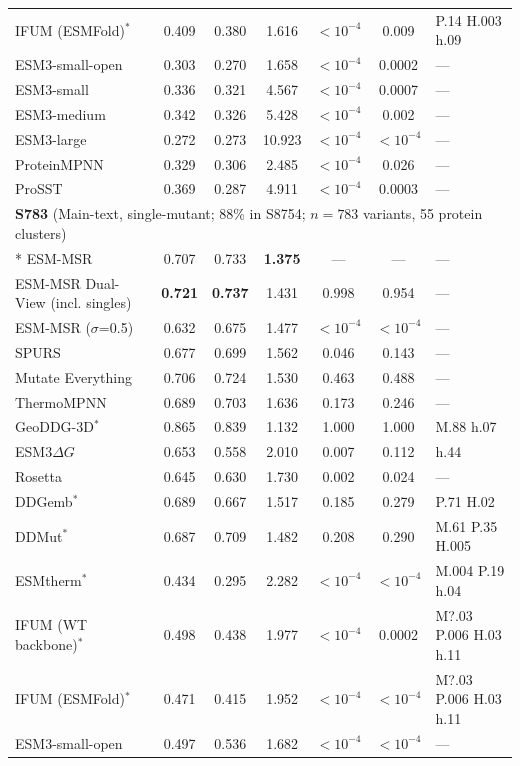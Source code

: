 {\begin{longtable}{lcccccl}
IFUM (ESMFold)$^*$ & 0.409 & 0.380 & 1.616 & $<10^{-4}$ & 0.009 & P.14 H.003 h.09 \\
ESM3-small-open & 0.303 & 0.270 & 1.658 & $<10^{-4}$ & 0.0002 & --- \\
ESM3-small & 0.336 & 0.321 & 4.567 & $<10^{-4}$ & 0.0007 & --- \\
ESM3-medium & 0.342 & 0.326 & 5.428 & $<10^{-4}$ & 0.002 & --- \\
ESM3-large & 0.272 & 0.273 & 10.923 & $<10^{-4}$ & $<10^{-4}$ & --- \\
ProteinMPNN & 0.329 & 0.306 & 2.485 & $<10^{-4}$ & 0.026 & --- \\
ProSST & 0.369 & 0.287 & 4.911 & $<10^{-4}$ & 0.0003 & --- \\
\midrule
\multicolumn{7}{l}{\textbf{S783} (Main-text, single-mutant; 88\% in S8754; $n=783$ variants, 55 protein clusters)} \\*
\midrule
ESM-MSR & 0.707 & 0.733 & \textbf{1.375} & --- & --- & --- \\
ESM-MSR Dual-View (incl. singles) & \textbf{0.721} & \textbf{0.737} & 1.431 & 0.998 & 0.954 & --- \\
ESM-MSR ($\sigma$=0.5) & 0.632 & 0.675 & 1.477 & $<10^{-4}$ & $<10^{-4}$ & --- \\
SPURS & 0.677 & 0.699 & 1.562 & 0.046 & 0.143 & --- \\
Mutate Everything & 0.706 & 0.724 & 1.530 & 0.463 & 0.488 & --- \\
ThermoMPNN & 0.689 & 0.703 & 1.636 & 0.173 & 0.246 & --- \\
GeoDDG-3D$^*$ & 0.865 & 0.839 & 1.132 & 1.000 & 1.000 & M.88 h.07 \\
ESM3$\Delta G$ & 0.653 & 0.558 & 2.010 & 0.007 & 0.112 & h.44 \\
Rosetta & 0.645 & 0.630 & 1.730 & 0.002 & 0.024 & --- \\
DDGemb$^*$ & 0.689 & 0.667 & 1.517 & 0.185 & 0.279 & P.71 H.02 \\
DDMut$^*$ & 0.687 & 0.709 & 1.482 & 0.208 & 0.290 & M.61 P.35 H.005 \\
ESMtherm$^*$ & 0.434 & 0.295 & 2.282 & $<10^{-4}$ & $<10^{-4}$ & M.004 P.19 h.04 \\
IFUM (WT backbone)$^*$ & 0.498 & 0.438 & 1.977 & $<10^{-4}$ & 0.0002 & M?.03 P.006 H.03 h.11 \\
IFUM (ESMFold)$^*$ & 0.471 & 0.415 & 1.952 & $<10^{-4}$ & $<10^{-4}$ & M?.03 P.006 H.03 h.11 \\
ESM3-small-open & 0.497 & 0.536 & 1.682 & $<10^{-4}$ & $<10^{-4}$ & --- \\

\end{longtable}}
